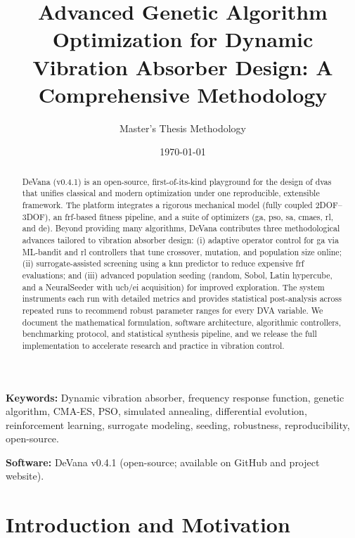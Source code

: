 \documentclass[12pt,a4paper]{article}
\title{Advanced Genetic Algorithm Optimization for Dynamic Vibration Absorber Design: A Comprehensive Methodology}
\author{Master's Thesis Methodology}
\date{\today}
\newcommand{\softwareName}{DeVana}
\newcommand{\softwareVersion}{v0.4.1}
\begin{document}
\maketitle

\begin{abstract}
\softwareName{} (\softwareVersion{}) is an open-source, first-of-its-kind playground for the design of \glspl{dva} that unifies classical and modern optimization under one reproducible, extensible framework. The platform integrates a rigorous mechanical model (fully coupled 2DOF--3DOF), an \gls{frf}-based fitness pipeline, and a suite of optimizers (\gls{ga}, \gls{pso}, \gls{sa}, \gls{cmaes}, \gls{rl}, and \gls{de}). Beyond providing many algorithms, \softwareName{} contributes three methodological advances tailored to vibration absorber design: (i) adaptive operator control for \gls{ga} via ML-bandit and \gls{rl} controllers that tune crossover, mutation, and population size online; (ii) surrogate-assisted screening using a \gls{knn} predictor to reduce expensive \gls{frf} evaluations; and (iii) advanced population seeding (random, Sobol, Latin hypercube, and a NeuralSeeder with \gls{ucb}/\gls{ei} acquisition) for improved exploration. The system instruments each run with detailed metrics and provides statistical post-analysis across repeated runs to recommend robust parameter ranges for every DVA variable. We document the mathematical formulation, software architecture, algorithmic controllers, benchmarking protocol, and statistical synthesis pipeline, and we release the full implementation to accelerate research and practice in vibration control.
\end{abstract}

\noindent\textbf{Keywords:} Dynamic vibration absorber, frequency response function, genetic algorithm, CMA-ES, PSO, simulated annealing, differential evolution, reinforcement learning, surrogate modeling, seeding, robustness, reproducibility, open-source.

\vspace{0.5em}
\noindent\textbf{Software:} \softwareName{} \softwareVersion{} (open-source; available on GitHub and project website).

\tableofcontents
\newpage

\printglossary[type=\acronymtype,title=List of Acronyms]
\newpage

\section{Introduction and Motivation}
\end{document}
